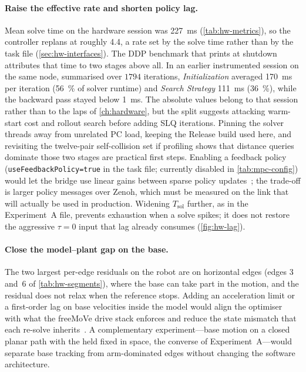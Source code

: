 \paragraph{Raise the effective \mpc{} rate and shorten policy lag.}
Mean solve time on the hardware session was \qty{227}{\milli\second}
(\cref{tab:hw-metrics}), so the controller replans at roughly
\qty{4.4}{\hz}, a rate set by the solve time rather than by the task
file (\cref{sec:hw-interfaces}). The DDP benchmark that \ocs{} prints at
shutdown attributes that time to two stages above all. In an earlier
instrumented session on the same node, summarised over $1794$
iterations, \emph{Initialization} averaged \qty{170}{\milli\second} per
iteration (\qty{56}{\percent} of solver runtime) and \emph{Search
Strategy} \qty{111}{\milli\second} (\qty{36}{\percent}), while the
backward pass stayed below \qty{1}{\milli\second}. The absolute values
belong to that session rather than to the laps of \cref{ch:hardware},
but the split suggests attacking warm-start cost and rollout search
before adding SLQ iterations. Pinning the solver threads
away from unrelated PC load, keeping the Release build used here,
and revisiting the twelve-pair self-collision set if profiling shows
that distance queries dominate those two stages are practical first
steps. Enabling a feedback policy
(\texttt{useFeedbackPolicy=true} in the task file; currently disabled in
\cref{tab:mpc-config}) would let the bridge use linear gains between
sparse policy updates~\cite{Grandia2019FeedbackMPC,ocs2Toolbox}; the
trade-off is larger policy messages over Zenoh, which must be measured on
the link that will actually be used in production. Widening $T_{\mathrm{sol}}$ further, as in the Experiment~A
file, prevents exhaustion when a solve spikes; it does not restore the
aggressive $\tau=0$ input that lag already consumes (\cref{fig:hw-lag}).

\paragraph{Close the model--plant gap on the base.}
The two largest per-edge residuals on the robot are on horizontal edges
(edges 3 and~6 of \cref{tab:hw-segments}), where the base can take part
in the motion, and the residual does not relax when the reference stops.
Adding an acceleration limit or a first-order lag on base velocities
inside the \ocs{} model would align the optimiser with what the
freeMoVe drive stack enforces and reduce the state mismatch that each
re-solve inherits~\cite{HenkelRoth2019freeMoVe}. A complementary
experiment---base motion on a closed planar path with the \ee{} held
fixed in space, the converse of Experiment~A---would separate base
tracking from arm-dominated edges without changing the software
architecture.

